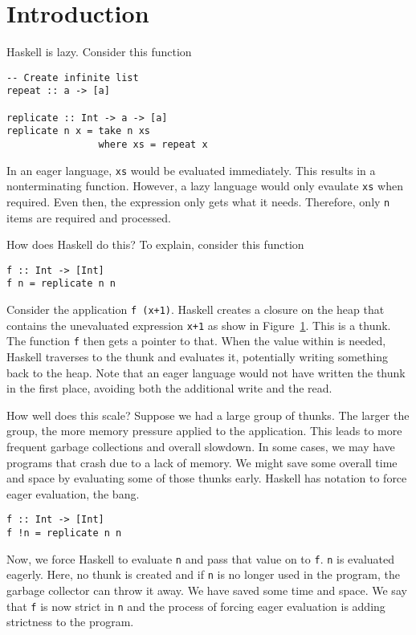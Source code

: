 \documentclass{sigplanconf}
\begin{document}
\section{Introduction}\label{sec:intro}

Haskell is lazy. Consider this function
\begin{lstlisting}[label={lst:repl}]
-- Create infinite list
repeat :: a -> [a]

replicate :: Int -> a -> [a]
replicate n x = take n xs
                where xs = repeat x
\end{lstlisting}
In an eager language, \lstinline!xs! would be evaluated immediately. This results in a nonterminating function. However, a lazy language would only evaulate \lstinline!xs! when required. Even then, the expression only gets what it needs. Therefore, only \lstinline!n! items are required and processed.

How does Haskell do this? To explain, consider this function
\begin{lstlisting}[label={lst:f}]
f :: Int -> [Int]
f n = replicate n n
\end{lstlisting}
\begin{figure}
\label{fig:thunk}
\end{figure}
Consider the application \lstinline!f (x+1)!. Haskell creates a closure on the heap that contains the unevaluated expression \lstinline!x+1! as show in Figure~\ref{fig:thunk}. This is a thunk. The function \lstinline!f! then gets a pointer to that. When the value within is needed, Haskell traverses to the thunk and evaluates it, potentially writing something back to the heap. Note that an eager language would not have written the thunk in the first place, avoiding both the additional write and the read.

How well does this scale? Suppose we had a large group of thunks. The larger the group, the more memory pressure applied to the application. This leads to more frequent garbage collections and overall slowdown. In some cases, we may have programs that crash due to a lack of memory. We might save some overall time and space by evaluating some of those thunks early. Haskell has notation to force eager evaluation, the bang.
\begin{lstlisting}[label={lst:fstrict}]
f :: Int -> [Int]
f !n = replicate n n
\end{lstlisting}

Now, we force Haskell to evaluate \lstinline!n! and pass that value on to \lstinline!f!. \lstinline{n} is evaluated eagerly. Here, no thunk is created and if \lstinline{n} is no longer used in the program, the garbage collector can throw it away. We have saved some time and space. We say that \lstinline!f! is now strict in \lstinline!n! and the process of forcing eager evaluation is adding strictness to the program.
\end{document}
